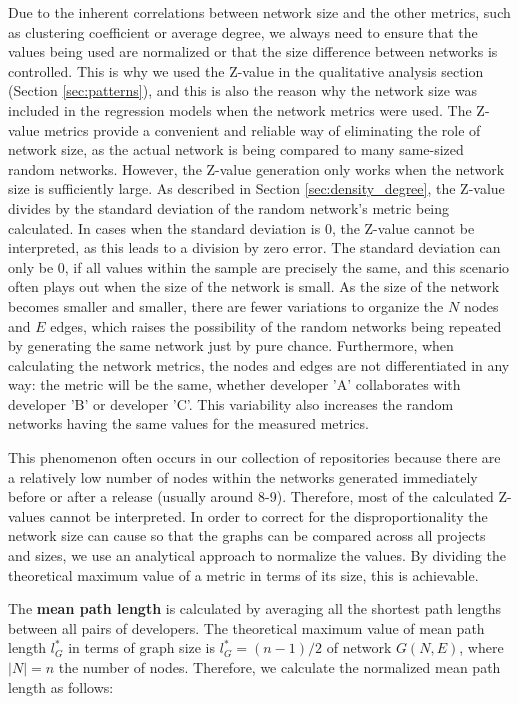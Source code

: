 Due to the inherent correlations between network size and the other metrics, such as clustering coefficient or average degree, we always need to ensure that the values being used are normalized or that the size difference between networks is controlled. This is why we used the Z-value in the qualitative analysis section (Section \ref{sec:patterns}), and this is also the reason why the network size was included in the regression models when the network metrics were used. The Z-value metrics provide a convenient and reliable way of eliminating the role of network size, as the actual network is being compared to many same-sized random networks. However, the Z-value generation only works when the network size is sufficiently large. As described in Section \ref{sec:density_degree}, the Z-value divides by the standard deviation of the random network's metric being calculated. In cases when the standard deviation is $0$, the Z-value cannot be interpreted, as this leads to a division by zero error. The standard deviation can only be $0$, if all values within the sample are precisely the same, and this scenario often plays out when the size of the network is small. As the size of the network becomes smaller and smaller, there are fewer variations to organize the $N$ nodes and $E$ edges, which raises the possibility of the random networks being repeated by generating the same network just by pure chance. Furthermore, when calculating the network metrics, the nodes and edges are not differentiated in any way: the metric will be the same, whether developer 'A' collaborates with developer 'B' or developer 'C'. This variability also increases the random networks having the same values for the measured metrics.

This phenomenon often occurs in our collection of repositories because there are a relatively low number of nodes within the networks generated immediately before or after a release (usually around 8-9). Therefore, most of the calculated Z-values cannot be interpreted. In order to correct for the disproportionality the network size can cause so that the graphs can be compared across all projects and sizes, we use an analytical approach to normalize the values. By dividing the theoretical maximum value of a metric in terms of its size, this is achievable.

The \textbf{mean path length} is calculated by averaging all the shortest path lengths between all pairs of developers. The theoretical maximum value of mean path length $l_G^*$ in terms of graph size is $l_G^* = (n-1)/2$ of network $G(N,E)$, where $|N| = n$ the number of nodes. Therefore, we calculate the normalized mean path length as follows:

